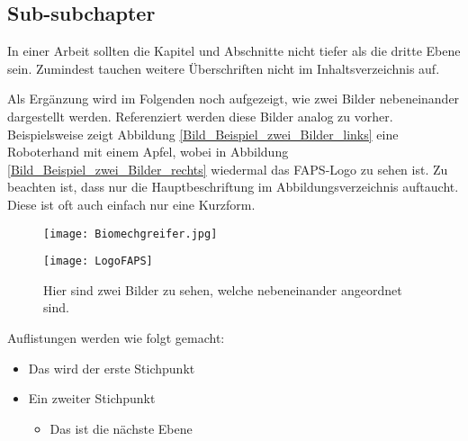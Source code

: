 \subsection{Sub-subchapter}
In einer Arbeit sollten die Kapitel und Abschnitte nicht tiefer als die dritte
Ebene sein. Zumindest tauchen weitere Überschriften nicht im Inhaltsverzeichnis auf.

Als Ergänzung wird im Folgenden noch aufgezeigt, wie zwei Bilder nebeneinander
dargestellt werden. Referenziert werden diese Bilder analog zu vorher. Beispielsweise zeigt Abbildung \ref{Bild_Beispiel_zwei_Bilder_links} eine Roboterhand mit einem Apfel, wobei in Abbildung \ref{Bild_Beispiel_zwei_Bilder_rechts} wiedermal das FAPS-Logo zu sehen ist. Zu beachten ist, dass nur die Hauptbeschriftung im Abbildungsverzeichnis auftaucht. Diese ist oft auch einfach nur eine Kurzform.

\begin{figure}[ht!]

\newcommand{\pictureheight}{5cm}

	\begin{minipage}[c]{.49\textwidth}
		\centering
		\texttt{[image: Biomechgreifer.jpg]}
		\label{Bild_Beispiel_zwei_Bilder_links}
	\end{minipage}
%	
	\begin{minipage}[c]{.49\textwidth}
        \centering
		\texttt{[image: LogoFAPS]}
		\label{Bild_Beispiel_zwei_Bilder_rechts}
	\end{minipage}
    	
    	\caption[Zwei Bilder nebeneinander]{Hier sind zwei Bilder zu sehen, welche nebeneinander angeordnet sind.}
	\label{Bild_Beispiel_zwei_Bilder}

\end{figure}

Auflistungen werden wie folgt gemacht:
\begin{itemize}
	\item Das wird der erste Stichpunkt
	\item Ein zweiter Stichpunkt
	
	\begin{itemize}
		\item Das ist die nächste Ebene
	\end{itemize}
	
\end{itemize}